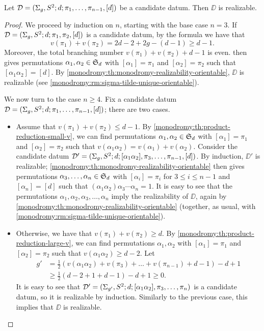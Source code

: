 \begin{proposition}\label{monodromy:th:sphere-[d]}
Let $\mathcal{D}=(\Sigma_{g},S^2{};d;\pi_1,\ldots,\pi_{n-1},[d])$ be a candidate datum. Then $\DD$ is realizable.
\end{proposition}
\begin{proof}
We proceed by induction on $n$, starting with the base case $n=3$. If $\mathcal{D}=(\Sigma_{g},S^2{};d;\pi_1,\pi_2,[d])$ is a candidate datum, by the \RH{} formula we have that
\[
v(\pi_1)+v(\pi_2)=2d-2+2g-(d-1)\ge d-1.
\]
Moreover, the total branching number $v(\pi_1)+v(\pi_2)+d-1$ is even.  then gives permutations $\alpha_1,\alpha_2\in\symgroup[d]$ with $[\alpha_1]=\pi_1$ and $[\alpha_2]=\pi_2$ such that $[\alpha_1\alpha_2]=[d]$. By \cref{monodromy:th:monodromy-realizability-orientable}, $\DD$ is realizable (see \cref{monodromy:rm:sigma-tilde-unique-orientable}).

We now turn to the case $n\ge 4$. Fix a candidate datum $\mathcal{D}=(\Sigma_{g},S^2{};d;\pi_1,\ldots,\pi_{n-1},[d])$; there are two cases.
\begin{itemize}
\item Assume that $v(\pi_1)+v(\pi_2)\le d-1$. By \cref{monodromy:th:product-reduction-small-v}, we can find permutations $\alpha_1,\alpha_2\in\symgroup[d]$ with $[\alpha_1]=\pi_1$ and $[\alpha_2]=\pi_2$ such that $v(\alpha_1\alpha_2)=v(\alpha_1)+v(\alpha_2)$. Consider the candidate datum $\mathcal{D}'=(\Sigma_{g},S^2{};d;[\alpha_1\alpha_2],\pi_3,\ldots,\pi_{n-1},[d])$. By induction, $\DD'$ is realizable; \cref{monodromy:th:monodromy-realizability-orientable} then gives permutations $\alpha_3,\ldots,\alpha_n\in\symgroup[d]$ with $[\alpha_i]=\pi_i$ for $3\le i\le n-1$ and $[\alpha_n]=[d]$ such that $(\alpha_1\alpha_2)\alpha_3\cdots\alpha_n=1$. It is easy to see that the permutations $\alpha_1,\alpha_2,\alpha_3,\ldots,\alpha_n$ imply the realizability of $\DD$, again by \cref{monodromy:th:monodromy-realizability-orientable} (together, as usual, with \cref{monodromy:rm:sigma-tilde-unique-orientable}).
\item Otherwise, we have that $v(\pi_1)+v(\pi_2)\ge d$. By \cref{monodromy:th:product-reduction-large-v}, we can find permutations $\alpha_1,\alpha_2$ with $[\alpha_1]=\pi_1$ and $[\alpha_2]=\pi_2$ such that $v(\alpha_1\alpha_2)\ge d-2$. Let
\begin{align*}
g'&=\frac{1}{2}(v(\alpha_1\alpha_2)+v(\pi_3)+\ldots+v(\pi_{n-1})+d-1)-d+1\\
&\ge\frac{1}{2}(d-2+1+d-1)-d+1\ge 0.
\end{align*}
It is easy to see that $\mathcal{D}'=(\Sigma_{g'},S^2{};d;[\alpha_1\alpha_2],\pi_3,\ldots,\pi_n)$ is a candidate datum, so it is realizable by induction. Similarly to the previous case, this implies that $\DD$ is realizable.\qedhere
\end{itemize}
\end{proof}

